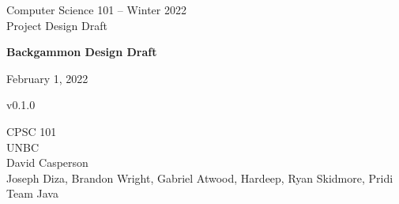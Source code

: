 \begin{titlepage}
    \begin{center}
        \vspace{1.5cm}
        
        \Large
        Computer Science 101 -- Winter 2022 \\
        Project Design Draft
        
        \vspace*{4cm}
            
        \huge
        \textbf{Backgammon Design Draft}
        \vspace*{0.4cm}

        \large
        February 1, 2022 \\
        \vspace*{0.2cm}

        \footnotesize
        v0.1.0
        \vspace{1.5cm}

        \vfill
        CPSC 101 \\
        UNBC \\
        David Casperson \\

        \vspace{0.8cm}
        Joseph Diza, Brandon Wright, Gabriel Atwood, Hardeep, Ryan Skidmore, Pridi \\
        Team Java
    \end{center}
\end{titlepage}
